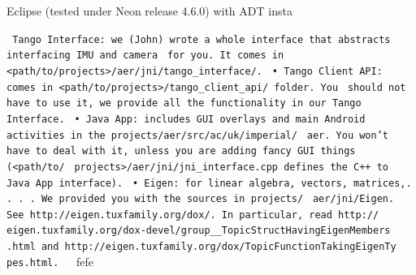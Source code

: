 \documentclass[12pt,twoside]{article}
\begin{document}
Eclipse (tested under Neon release 4.6.0) with ADT insta


\verb| Tango Interface: we (John) wrote a whole interface that abstracts interfacing IMU and camera|
\verb| for you. It comes in <path/to/projects>/aer/jni/tango_interface/.|
\verb| • Tango Client API: comes in <path/to/projects>/tango_client_api/ folder. You|
\verb| should not have to use it, we provide all the functionality in our Tango Interface.|
\verb| • Java App: includes GUI overlays and main Android activities in the projects/aer/src/ac/uk/imperial/|
\verb| aer. You won’t have to deal with it, unless you are adding fancy GUI things (<path/to/|
\verb| projects>/aer/jni/jni_interface.cpp defines the C++ to Java App interface).|
\verb| • Eigen: for linear algebra, vectors, matrices,. . . . We provided you with the sources in projects/|
\verb| aer/jni/Eigen. See http://eigen.tuxfamily.org/dox/. In particular, read http://|
\verb| eigen.tuxfamily.org/dox-devel/group__TopicStructHavingEigenMembers|
\verb| .html and http://eigen.tuxfamily.org/dox/TopicFunctionTakingEigenTy|
\verb| pes.html.   |fefe
\end{document}
